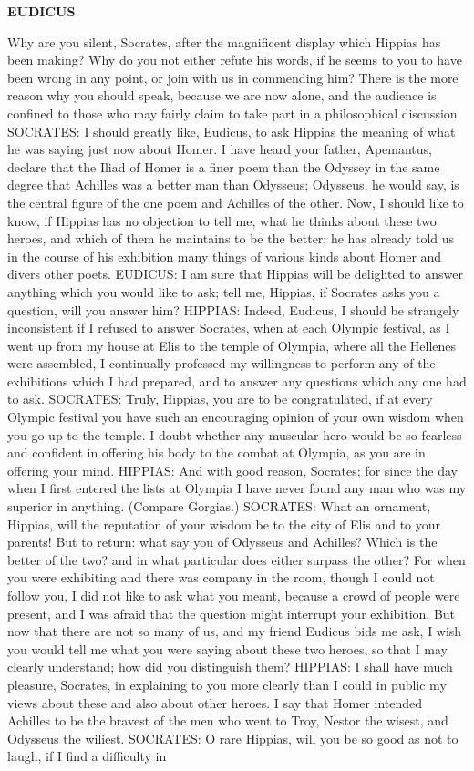 \documentclass[11pt,letter]{article}
\begin{document}
\par \textbf{EUDICUS}
\par   Why are you silent, Socrates, after the magnificent display which Hippias has been making? Why do you not either refute his words, if he seems to you to have been wrong in any point, or join with us in commending him? There is the more reason why you should speak, because we are now alone, and the audience is confined to those who may fairly claim to take part in a philosophical discussion. SOCRATES:  I should greatly like, Eudicus, to ask Hippias the meaning of what he was saying just now about Homer. I have heard your father, Apemantus, declare that the Iliad of Homer is a finer poem than the Odyssey in the same degree that Achilles was a better man than Odysseus; Odysseus, he would say, is the central figure of the one poem and Achilles of the other. Now, I should like to know, if Hippias has no objection to tell me, what he thinks about these two heroes, and which of them he maintains to be the better; he has already told us in the course of his exhibition many things of various kinds about Homer and divers other poets. EUDICUS:  I am sure that Hippias will be delighted to answer anything which you would like to ask; tell me, Hippias, if Socrates asks you a question, will you answer him? HIPPIAS:  Indeed, Eudicus, I should be strangely inconsistent if I refused to answer Socrates, when at each Olympic festival, as I went up from my house at Elis to the temple of Olympia, where all the Hellenes were assembled, I continually professed my willingness to perform any of the exhibitions which I had prepared, and to answer any questions which any one had to ask. SOCRATES:  Truly, Hippias, you are to be congratulated, if at every Olympic festival you have such an encouraging opinion of your own wisdom when you go up to the temple. I doubt whether any muscular hero would be so fearless and confident in offering his body to the combat at Olympia, as you are in offering your mind. HIPPIAS:  And with good reason, Socrates; for since the day when I first entered the lists at Olympia I have never found any man who was my superior in anything. (Compare Gorgias.) SOCRATES:  What an ornament, Hippias, will the reputation of your wisdom be to the city of Elis and to your parents! But to return:  what say you of Odysseus and Achilles? Which is the better of the two? and in what particular does either surpass the other? For when you were exhibiting and there was company in the room, though I could not follow you, I did not like to ask what you meant, because a crowd of people were present, and I was afraid that the question might interrupt your exhibition. But now that there are not so many of us, and my friend Eudicus bids me ask, I wish you would tell me what you were saying about these two heroes, so that I may clearly understand; how did you distinguish them? HIPPIAS:  I shall have much pleasure, Socrates, in explaining to you more clearly than I could in public my views about these and also about other heroes. I say that Homer intended Achilles to be the bravest of the men who went to Troy, Nestor the wisest, and Odysseus the wiliest. SOCRATES:  O rare Hippias, will you be so good as not to laugh, if I find a difficulty in 
\end{document}
